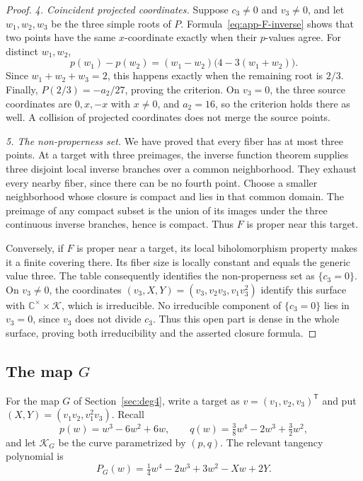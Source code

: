 \documentclass[11pt]{article}
\numberwithin{equation}{section}
\theoremstyle{plain}
\theoremstyle{definition}
\theoremstyle{remark}
\newcommand{\C}{\mathbb{C}}
\begin{document}
\begin{proof}
\emph{4. Coincident projected coordinates.}
Suppose $c_3\ne0$ and $v_3\ne0$, and let $w_1,w_2,w_3$ be the three
simple roots of $P$. Formula~\eqref{eq:app-F-inverse} shows that two
points have the same $x$-coordinate exactly when their $p$-values agree.
For distinct $w_1,w_2$,
\[
 p(w_1)-p(w_2)=(w_1-w_2)\bigl(4-3(w_1+w_2)\bigr).
\]
Since $w_1+w_2+w_3=2$, this happens exactly when the remaining root
is $2/3$. Finally, $P(2/3)=-a_2/27$, proving the criterion.
On $v_3=0$, the three source coordinates are $0,x,-x$ with $x\ne0$,
and $a_2=16$, so the criterion holds there as well. A collision of
projected coordinates does not merge the source points.

\emph{5. The non-properness set.}
We have proved that every fiber has at most three points. At a target
with three preimages, the inverse function theorem supplies three
disjoint local inverse branches over a common neighborhood. They exhaust
every nearby fiber, since there can be no fourth point. Choose a smaller
neighborhood whose closure is compact and lies in that common domain.
The preimage of any compact subset is the union of its images under
the three continuous inverse branches, hence is compact. Thus $F$ is
proper near this target.

Conversely, if $F$ is proper near a target, its local biholomorphism
property makes it a finite covering there. Its fiber size is locally
constant and equals the generic value three. The table consequently
identifies the non-properness set as $\{c_3=0\}$.
On $v_3\ne0$, the coordinates $(v_3,X,Y)=(v_3,v_2v_3,v_1v_3^2)$ identify this
surface with $\C^\times\times\mathcal K$, which is irreducible.
No irreducible component of $\{c_3=0\}$ lies in $v_3=0$, since $v_3$ does
not divide $c_3$. Thus this open part is dense in the whole surface,
proving both irreducibility and the asserted closure formula.
\end{proof}

\subsection{The map \texorpdfstring{$G$}{G}}\label{app:G}
For the map $G$ of Section~\ref{sec:deg4}, write a target as $v=(v_1,v_2,v_3)^{\mathsf T}$
and put $(X,Y)=(v_1v_2,v_1^2v_3)$. Recall
\[
 p(w)=w^3-6w^2+6w,\qquad
 q(w)=\tfrac38w^4-2w^3+\tfrac32w^2,
\]
and let $\mathcal K_G$ be the curve parametrized by $(p,q)$.
The relevant tangency polynomial is
\[
 P_G(w)=\tfrac14w^4-2w^3+3w^2-Xw+2Y.
\]
\end{document}
